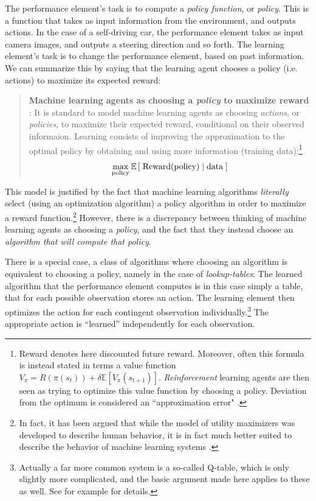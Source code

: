The performance element's task is to compute a \textit{policy function}, or \textit{policy}. This is a function that takes as input information from the environment, and outputs actions. In the case of a self-driving car, the performance element takes as input camera images, and outputs a steering direction and so forth. The learning element's task is to change the performance element, based on past information. We can summarize this by saying that the learning agent chooses a policy (i.e. actions) to maximize its expected reward:
\begin{quote}
	\textbf{Machine learning agents as choosing a \textit{policy} to maximize reward} : It is standard to model machine learning agents as choosing \textit{actions}, or \textit{policies}, to maximize their expected reward, conditional on their observed informaion. Learning consists of improving the approximation to the optimal policy by obtaining and using more information (training data):\footnote{Reward denotes here discounted future reward. Moreover, often this formula is instead stated in terms a value function $V_\pi=R(\pi(s_t))+\delta \mathbb E[V_\pi(s_{t+1})]$. \textit{Reinforcement} learning agents are then seen as trying to optimize this value function by choosing a policy. Deviation from the optimum is considered an ``approximation error" \citep{Kaelbling1996,Sutton1998,Sxepesvari2010}. } $$\max\limits_{\text{policy}} \mathbb E\left[\text{\;Reward(policy)}\;|\;\text{data}\;\right]$$
\end{quote}




This model is justified by the fact that machine learning algorithms \textit{literally} select (using an optimization algorithm) a policy algorithm in order to maximize a reward function.\footnote{In fact, it has been argued that while the model of utility maximizers was developed to describe human behavior, it is in fact much better suited to describe the behavior of machine learning systems \citep{Parkes2015}.} However, there is a discrepancy between thinking of machine learning agents as choosing a \textit{policy}, and the fact that they instead choose an \textit{algorithm that will compute that policy}. 

There is a special case, a class of algorithms where choosing an algorithm is equivalent to choosing a policy, namely in the case of \textit{lookup-tables}: The learned algorithm that the performance element computes is in this case simply a table, that for each possible observation stores an action. The learning element then optimizes the action for each contingent observation individually.\footnote{Actually a far more common system is a so-called Q-table, which is only slightly more complicated, and the basic argument made here applies to these as well. See for example \citep{Sutton1998} for details.} The appropriate action is “learned” independently for each observation.

